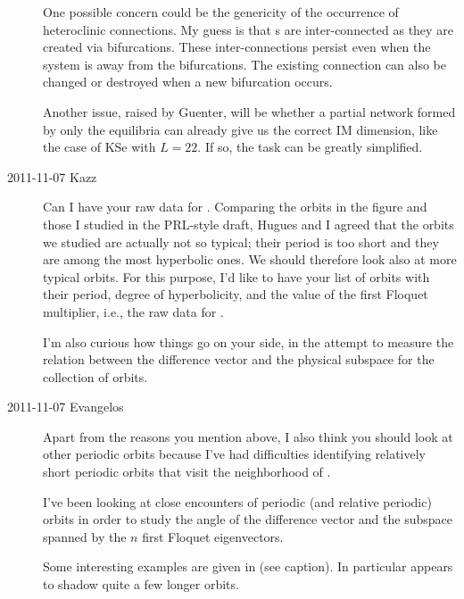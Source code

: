 \begin{description}
  One possible concern could be the genericity of the occurrence of
  heteroclinic connections. My guess is that \po s are inter-connected as
  they are created via bifurcations. These inter-connections persist even
  when the system is away from the bifurcations. The existing connection
  can also be changed or destroyed when a new bifurcation occurs.

  Another issue, raised by Guenter, will be whether a partial network
  formed by only the equilibria can already give us the correct IM
  dimension, like the case of KSe with $L=22$. If so, the task can be greatly
  simplified.

\item[2011-11-07 Kazz] Can I have your raw data for .
  Comparing the orbits in the figure and those I studied in the PRL-style draft,
  Hugues and I agreed that the orbits we studied are actually not so typical;
  their period is too short and they are among the most hyperbolic ones.
  We should therefore look also at more typical orbits.
  For this purpose, I'd like to have your list of orbits with their period,
  degree of hyperbolicity, and the value of the first Floquet multiplier, i.e.,
  the raw data for .

  I'm also curious how things go on your side, in the attempt to measure
  the relation between the difference vector and the physical subspace
  for the collection of orbits.

\item[2011-11-07 Evangelos] Apart from the reasons you mention above,
  I also think you should look at other periodic orbits because I've
  had difficulties identifying relatively short periodic orbits that visit
  the neighborhood of .

  I've been looking at close encounters of periodic (and relative periodic) orbits
  in order to study the angle of the difference vector and the subspace spanned
  by the $n$ first Floquet eigenvectors.

  Some interesting examples are given in  (see caption).
  In particular  appears to shadow quite a few longer orbits.


\end{description}
